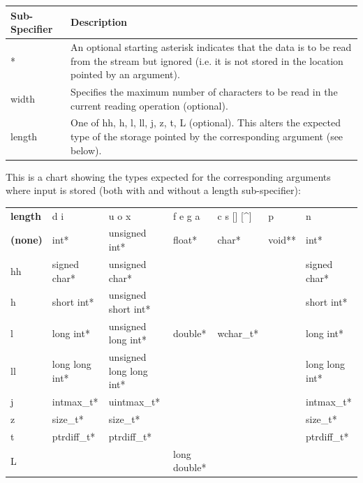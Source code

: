 \documentclass[10pt]{article}
\begin{document}
\begin{center}
    \begin{tabularx}{\linewidth}{|l|X|}
        \hline
        \textbf{Sub-Specifier} & \textbf{Description} \\
        \hline
        * & An optional starting asterisk indicates that the data is to be read
            from the stream but ignored (i.e. it is not stored in the location
            pointed by an argument). \\
        \hline
        width & Specifies the maximum number of characters to be read in the
                current reading operation (optional). \\
        \hline
        length & One of hh, h, l, ll, j, z, t, L (optional). This alters the
                    expected type of the storage pointed by the corresponding
                    argument (see below). \\
        \hline
    \end{tabularx}
\end{center}

This is a chart showing the types expected for the corresponding arguments where
input is stored (both with and without a length sub-specifier):

\begin{center}
    \begin{tabularx}{\linewidth}{|l|*{6}{>{\RaggedRight\arraybackslash}X|}}
        \hline
        & \multicolumn{6}{c|}{\textbf{Specifiers}} \\
        \hline
        \textbf{length} & d i & u o x & f e g a & c s [] [\^{}] & p & n \\
        \hline
        \textbf{(none)} & int* & unsigned int* & float* & char* & void** & int* \\
        \hline
        hh & signed char* & unsigned char* & & & & signed char* \\
        \hline
        h & short int* & unsigned short int* & & & & short int* \\
        \hline
        l & long int* & unsigned long int* & double* & wchar\_t* & & long int* \\
        \hline
        ll & long long int* & unsigned long long int* & & & & long long int* \\
        \hline
        j & intmax\_t* & uintmax\_t* & & & & intmax\_t* \\
        \hline
        z & size\_t* & size\_t* & & & & size\_t* \\
        \hline
        t & ptrdiff\_t* & ptrdiff\_t* & & & & ptrdiff\_t* \\
        \hline
        L & & & long double* & & & \\
        \hline
    \end{tabularx}
\end{center}
\end{document}

